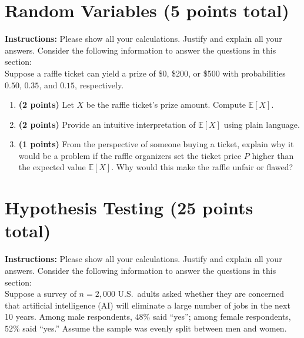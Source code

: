 \documentclass{article}
\newcommand{\blankbox}[2][3cm]{%
    \vspace{-0.5em}
    \begin{figure}[H]
        \makebox[\linewidth]{%
            \begin{tcolorbox}[
                colback=white,
                colframe=white,  %
                width=#2, %
                height=#1,
                boxrule=0.2mm
            ]
            \end{tcolorbox}
        }
    \end{figure}
    \vspace{-2em}
}
\begin{document}
\newpage

\section{Random Variables (5 points total)}
\noindent\textbf{Instructions:} Please show all your calculations. Justify and explain all your answers. Consider the following information to answer the questions in this section: \\

Suppose a raffle ticket can yield a prize of \$0, \$200, or \$500 with probabilities $0.50$, $0.35$, and $0.15$, respectively.
\begin{enumerate}
\item \textbf{(2 points)}  Let $X$ be the raffle ticket's prize amount. Compute $\mathbb{E}[X]$. \blankbox[6cm]{1.0\linewidth}
\item \textbf{(2 points)} Provide an intuitive interpretation of $\mathbb{E}[X]$ using plain language. \blankbox[7cm]{1.0\linewidth}
\item \textbf{(1 points)} From the perspective of someone buying a ticket, explain why it would be a problem if the raffle organizers set the ticket price $P$ higher than the expected value $\mathbb{E}[X]$. Why would this make the raffle unfair or flawed? \blankbox[6cm]{1.0\linewidth}

\end{enumerate}

\newpage

\section{Hypothesis Testing (25 points total)}
\noindent\textbf{Instructions:} Please show all your calculations. Justify and explain all your answers. Consider the following information to answer the questions in this section: \\

Suppose a survey of $n = 2{,}000$ U.S.\ adults asked whether they are concerned that artificial intelligence (AI) will eliminate a large number of jobs in the next 10 years. Among male respondents, $48\%$ said “yes”; among female respondents, $52\%$ said “yes.” Assume the sample was evenly split between men and women.
\end{document}
